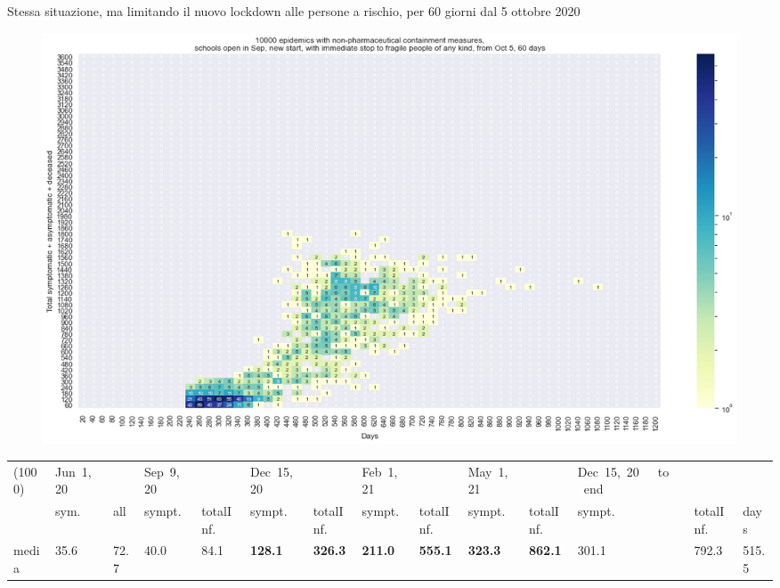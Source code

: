 \documentclass[]{beamer}
\begin{document}
\begin{frame}{Stessa situazione, ma limitando il nuovo lockdown alle persone a rischio, per 60  giorni dal 5 ottobre 2020}


\begin{figure}[H]
\center
\includegraphics[scale=0.22]{10kForceWave2NoFragOct5for60d.png}
\label{selForceWave2NoFrag}
\end{figure}


\begin{table}[H]
\center
\tiny
\begin{tabular}{p{0.3cm}p{0.3cm}p{0.3cm}p{0.3cm}p{0.3cm}p{0.3cm}p{0.3cm}p{0.3cm}p{0.3cm}p{0.3cm}p{0.3cm}p{0.3cm}p{0.3cm}p{0.4cm}}
\toprule
(1000) &  Jun~1,~20 & &  Sep~9,~20 & & Dec~15,~20 & & Feb~1,~21 & & May~1,~21 & & Dec~15,~20~~~to~~~end   \\
{} &  sym. &  all &  sympt. &  totalInf. &  sympt. &  totalInf. &  sympt. &  totalInf. &  sympt. &  totalInf. &  sympt. &  totalInf.  & days\\
\midrule
media  &     35.6 &                       72.7 &     40.0 &                       84.1 &    \textbf{{\color{cyan}128.1}} &                      \textbf{{\color{cyan}326.3}} &    \textbf{211.0} &                      \textbf{555.1} &    \textbf{323.3} &                      \textbf{862.1} &               301.1 &                   792.3 &  515.5 \\
\bottomrule
\end{tabular}

\label{selForceWave2NoFragTab}
\end{table}


\end{frame}
\end{document}
